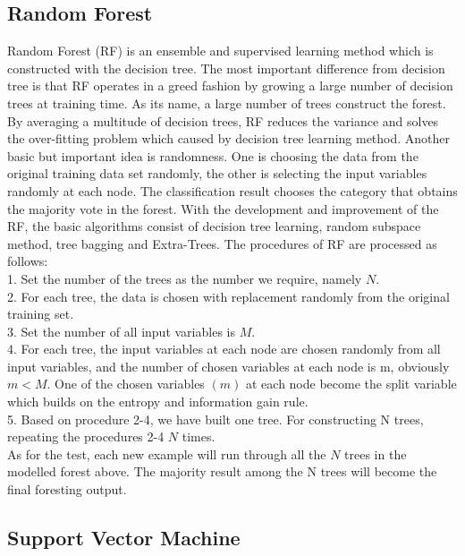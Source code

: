 \documentclass[12pt, a4paper, bibliography=totoc, english]{scrartcl}
\begin{document}
\subsection{Random Forest}\label{RF}
Random Forest (RF) is an ensemble and supervised learning method which is constructed with the decision tree. The most important difference from decision tree is that RF operates in a greed fashion by growing a large number of decision trees at training time.  As its name, a large number of trees construct the forest. By averaging a multitude of decision trees, RF reduces the variance and solves the over-fitting problem which caused by decision tree learning method. Another basic but important idea is randomness. One is choosing the data from the original training data set randomly, the other is selecting the input variables randomly at each node. The classification result chooses the category that obtains the majority vote in the forest. With the development and improvement of the RF, the basic algorithms consist of decision tree learning, random subspace method, tree bagging and Extra-Trees. 
The procedures of RF are processed as follows:\\
1.   Set the number of the trees as the number we require, namely $N$. \\
2.   For each tree, the data is chosen with replacement randomly from the original training set. \\
3.   Set the number of all input variables is $M$.\\
4.   For each tree, the input variables at each node are chosen randomly from all input variables, and the number of chosen variables at each node is m, obviously $m < M$. One of the chosen variables $(m)$ at each node become the split variable which builds on the entropy and information gain rule. \\
5.   Based on procedure 2-4, we have built one tree. For constructing N trees, repeating the procedures 2-4 $N$ times.\\
As for the test, each new example will run through all the $N$ trees in the modelled forest above. The majority result among the N trees will become the final foresting output. 

\subsection{Support Vector Machine}\label{SVM}
\end{document}
